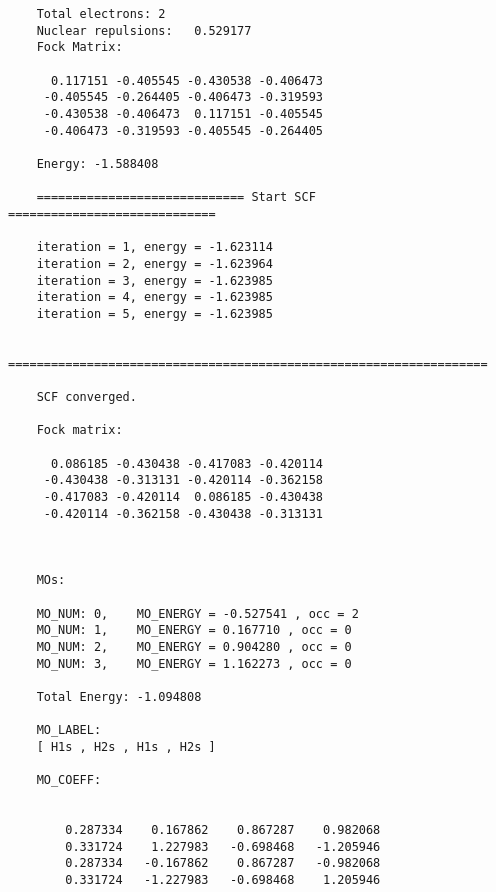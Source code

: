 \documentclass[12pt,a4paper,openany,twoside]{article}
\numberwithin{equation}{section}
\begin{document}
\begin{lstlisting}
    Total electrons: 2
    Nuclear repulsions:   0.529177
    Fock Matrix:
    
      0.117151 -0.405545 -0.430538 -0.406473
     -0.405545 -0.264405 -0.406473 -0.319593
     -0.430538 -0.406473  0.117151 -0.405545
     -0.406473 -0.319593 -0.405545 -0.264405
    
    Energy: -1.588408
    
    ============================= Start SCF =============================
    
    iteration = 1, energy = -1.623114
    iteration = 2, energy = -1.623964
    iteration = 3, energy = -1.623985
    iteration = 4, energy = -1.623985
    iteration = 5, energy = -1.623985
    
    ===================================================================
    
    SCF converged.
    
    Fock matrix:
    
      0.086185 -0.430438 -0.417083 -0.420114
     -0.430438 -0.313131 -0.420114 -0.362158
     -0.417083 -0.420114  0.086185 -0.430438
     -0.420114 -0.362158 -0.430438 -0.313131
    
    
    
    MOs:
    
    MO_NUM: 0,    MO_ENERGY = -0.527541 , occ = 2
    MO_NUM: 1,    MO_ENERGY = 0.167710 , occ = 0
    MO_NUM: 2,    MO_ENERGY = 0.904280 , occ = 0
    MO_NUM: 3,    MO_ENERGY = 1.162273 , occ = 0
    
    Total Energy: -1.094808
    
    MO_LABEL:
    [ H1s , H2s , H1s , H2s ]
    
    MO_COEFF:
    
    
        0.287334    0.167862    0.867287    0.982068
        0.331724    1.227983   -0.698468   -1.205946
        0.287334   -0.167862    0.867287   -0.982068
        0.331724   -1.227983   -0.698468    1.205946
\end{lstlisting}



    
\end{document}

